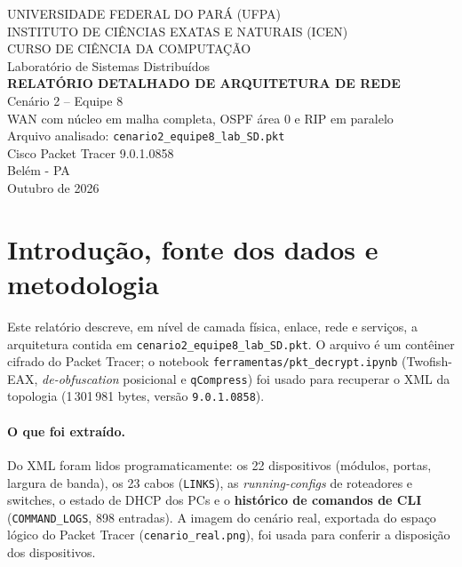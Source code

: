 \documentclass[12pt,a4paper]{article}
\begin{document}
\begin{titlepage}
\centering
{\large UNIVERSIDADE FEDERAL DO PARÁ (UFPA)}\\[0.3cm]
{\large INSTITUTO DE CIÊNCIAS EXATAS E NATURAIS (ICEN)}\\[0.3cm]
{\large CURSO DE CIÊNCIA DA COMPUTAÇÃO}\\[1cm]
{\large Laboratório de Sistemas Distribuídos}\\[3cm]
{\LARGE\bfseries RELATÓRIO DETALHADO DE ARQUITETURA DE REDE}\\[0.6cm]
{\large Cenário 2 -- Equipe 8\\ WAN com núcleo em malha completa, OSPF área 0 e RIP em paralelo}\\[1cm]
{\normalsize Arquivo analisado: \texttt{cenario2\_equipe8\_lab\_SD.pkt}\\ Cisco Packet Tracer 9.0.1.0858}\\[3cm]
\vfill
{\large Belém - PA}\\[0.2cm]{\large Outubro de 2026}
\end{titlepage}

\tableofcontents
\newpage

\section{Introdução, fonte dos dados e metodologia}
Este relatório descreve, em nível de camada física, enlace, rede e serviços, a arquitetura contida em \texttt{cenario2\_equipe8\_lab\_SD.pkt}. O arquivo é um contêiner cifrado do Packet Tracer; o notebook \texttt{ferramentas/pkt\_decrypt.ipynb} (Twofish-EAX, \textit{de-obfuscation} posicional e \texttt{qCompress}) foi usado para recuperar o XML da topologia (1\,301\,981 bytes, versão \texttt{9.0.1.0858}).

\paragraph{O que foi extraído.} Do XML foram lidos programaticamente: os 22 dispositivos (módulos, portas, largura de banda), os 23 cabos (\texttt{LINKS}), as \textit{running-configs} de roteadores e switches, o estado de DHCP dos PCs e o \textbf{histórico de comandos de CLI} (\texttt{COMMAND\_LOGS}, 898 entradas). A imagem do cenário real, exportada do espaço lógico do Packet Tracer (\texttt{cenario\_real.png}), foi usada para conferir a disposição dos dispositivos.
\end{document}
